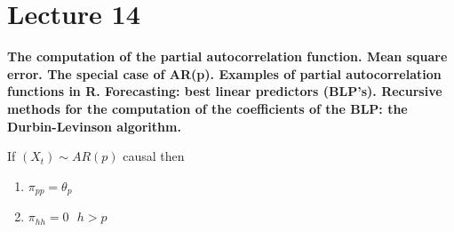 \section{Lecture 14}
\label{lecture14}

\begin{center}
    \textbf{The computation of the partial autocorrelation function. Mean square error. The special case of AR(p). Examples of partial autocorrelation functions in R. Forecasting: best linear predictors (BLP's). Recursive methods for the computation of the coefficients of the BLP: the Durbin-Levinson algorithm.}
\end{center}

\begin{theorem}
    \label{theorem13}
    If $(X_t)\sim AR(p)$ causal then
    \begin{enumerate}
        \item $\pi_{pp}=\theta_p$
        \item $\pi_{hh}=0\ \ \ h>p$
    \end{enumerate}
\end{theorem}

